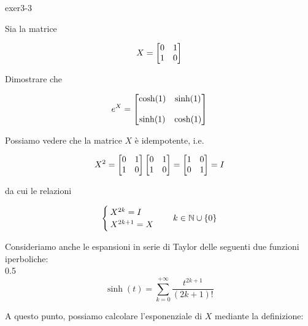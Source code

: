 
{exer3-3}
{
Sia la matrice

\begin{equation}
	X = \bmqty{ %
				0 & 1 \\
				1 & 0 %
				}
\end{equation}

Dimostrare che

\begin{equation}
	e^{X} = \bmqty{ %
					\cosh(1) & \sinh(1) \\ \\
					\sinh(1) & \cosh(1) %
					}
\end{equation}
}
{
Possiamo vedere che la matrice $ X $ è idempotente, i.e.

\begin{equation}
	X^{2} = \bmqty{ %
					0 & 1 \\
					1 & 0 %
					} %
	\bmqty{ %
			0 & 1 \\
			1 & 0 %
			} %
	= \bmqty{ %
				1 & 0 \\
				0 & 1 %
				} %
	= I
\end{equation}

da cui le relazioni

\begin{equation}
	\begin{cases}
		X^{2k} = I \\
		X^{2k+1} = X
	\end{cases}
	\quad k \in \mathbb{N} \cup \{0\}
\end{equation}

Consideriamo anche le espansioni in serie di Taylor delle seguenti due funzioni iperboliche: \\

	{0.5}{%
			\begin{equation}
				\sinh(t) = \sum_{k=0}^{+\infty} \dfrac{t^{2k+1}}{(2k+1)!}
			\end{equation}
			}

A questo punto, possiamo calcolare l'esponenziale di $ X $ mediante la definizione:

}
